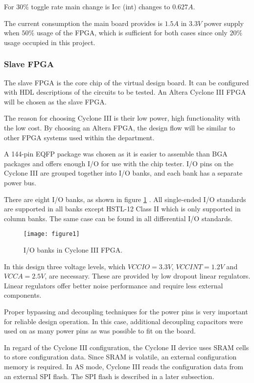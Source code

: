 For $30\%$ toggle rate main change is Icc (int) changes to $0.627A$.

The current consumption the main board provides is $1.5A$ in $3.3V$ power supply
when $50\%$ usage of the FPGA, which is sufficient for both cases since only $20\%$
usage occupied in this project.


\subsubsection{Slave FPGA}
The slave FPGA is the core chip of the virtual design board. It can be configured
with HDL descriptions of the circuits to be tested.
An Altera Cyclone III FPGA will be chosen as the slave FPGA.

The reason for choosing Cyclone III is their low power, high functionality with the low cost. By choosing
an Altera FPGA, the design flow will be similar to other FPGA systems used within the department.

A 144-pin EQFP package was chosen as it is easier to assemble than BGA packages and offers enough I/O
for use with the chip tester. I/O pins on the Cyclone III are grouped together into I/O banks,
and each bank has a separate power bus. 

There are eight I/O banks, as shown in figure \ref{fig:b2_f1} \citep{Altera:2011:cyclone3handbook}.
All single-ended I/O standards are supported in all banks except HSTL-12 Class II which is only supported in column banks.
The same case can be found in all differential I/O standards.

\begin{figure}
 \centering
 \texttt{[image: figure1]}
 \caption{I/O banks in Cyclone III FPGA.}
 \label{fig:b2_f1}
\end{figure}

In this design three voltage levels, which $VCCIO=3.3V$, $VCCINT= 1.2V$ and $VCCA=2.5V$, are necessary. These are provided
by low dropout linear regulators. Linear regulators offer better noise performance and require less external components.

Proper bypassing and decoupling techniques for the power pins is very important for reliable design operation.
In this case, additional decoupling capacitors were used on as many power pins as was possible to fit on the board.

In regard of the Cyclone III configuration, the Cyclone II device uses SRAM cells to
store configuration data. Since SRAM is volatile, an external configuration memory is required.
In AS mode, Cyclone III reads the configuration data from an external SPI flash. The SPI
flash is described in a later subsection.


